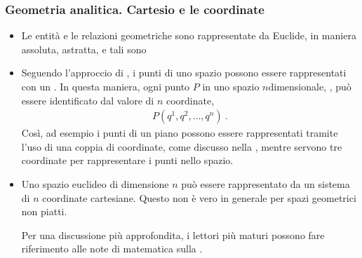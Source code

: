 \documentclass[letterpaper,10pt,italian]{jupyterBook}
\begin{document}
\subsubsection*{Geometria analitica. Cartesio e le coordinate}
\begin{itemize}
\item {} 
\sphinxAtStartPar
Le entità e le relazioni geometriche sono rappresentate da Euclide, in maniera assoluta, astratta, e tali sono

\item {} 
\sphinxAtStartPar
Seguendo l’approccio di , i punti di uno spazio possono essere rappresentati con un . In questa maniera, ogni punto \(P\) in uno spazio \(n\)\sphinxhyphen{}dimensionale, , può essere identificato dal valore di \(n\) coordinate,
\begin{equation*}
\begin{split}P(q^1, q^2, \dots, q^n) \ .\end{split}
\end{equation*}
\sphinxAtStartPar
Così, ad esempio i punti di un piano possono essere rappresentati tramite l’uso di una coppia di coordinate, come discusso nella {\hyperref[\detokenize{ch/analytic_geometry/analytic_geometry_2d/coordinates:geometry-analytic-2d-coordinates}]{}}, mentre servono tre coordinate per rappresentare i punti nello spazio.

\end{itemize}
\begin{itemize}
\item {} 
\sphinxAtStartPar
Uno spazio euclideo di dimensione \(n\) può essere rappresentato da un sistema di \(n\) coordinate cartesiane. Questo non è vero in generale per spazi geometrici non piatti.%
\begin{footnote}[1]\sphinxAtStartFootnote
Per una discussione più approfondita, i lettori più maturi possono fare riferimento alle note di matematica sulla .
%
\end{footnote}

\end{itemize}
\end{document}
